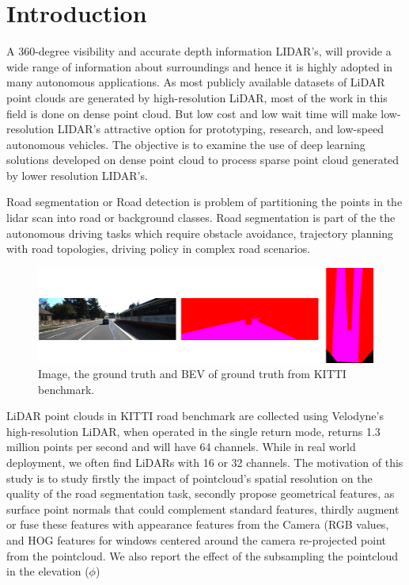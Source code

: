\documentclass[10pt,twocolumn,letterpaper]{article}
\begin{document}
\section{Introduction}
\label{sec:introduction}
A 360-degree visibility and accurate depth information LIDAR’s, will provide a wide range of information about surroundings and hence it is highly adopted in many autonomous applications. As most publicly available datasets of LiDAR point clouds are generated by high-resolution LiDAR, most of the work in this field is done on dense point cloud. But low cost and low wait time will make low-resolution LIDAR’s attractive option for prototyping, research, and low-speed autonomous vehicles. The objective is to examine the use of deep learning solutions developed on dense point cloud to process sparse point cloud generated by lower resolution LIDAR’s.

Road segmentation or Road detection is problem of partitioning the points in the lidar scan into road or background classes. Road segmentation is part of the the autonomous driving tasks which require obstacle avoidance, trajectory planning with road topologies, driving policy in complex road scenarios.


\begin{figure}
    \centering
    \includegraphics[width=0.75\linewidth]{gt.png}
    \caption{Image, the ground truth and BEV of ground truth from KITTI benchmark. }
    \label{fig:Kitti}
\end{figure}

LiDAR point clouds in KITTI road benchmark are collected using Velodyne’s high-resolution LiDAR, when operated in the single return mode, returns 1.3 million points per second and will have 64 channels. 
While in real world deployment, we often find LiDARs with 16 or 32 channels. The motivation of this study is to study firstly the impact of pointcloud's spatial resolution on the quality of the road segmentation task, secondly propose geometrical features, as surface point normals that could complement standard features, thirdly augment or fuse these features with appearance features from the Camera (RGB values, and HOG features for windows centered around the camera re-projected point from the pointcloud. We also report the effect of the subsampling the pointcloud in the elevation ($\phi$)
\end{document}

